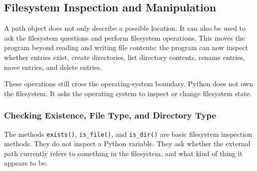 \subsection{Filesystem Inspection and Manipulation}

A path object does not only describe a possible location. It can also be used to ask the filesystem questions and perform filesystem operations. This moves the program beyond reading and writing file contents: the program can now inspect whether entries exist, create directories, list directory contents, rename entries, move entries, and delete entries.

These operations still cross the operating-system boundary. Python does not own the filesystem. It asks the operating system to inspect or change filesystem state.

\subsubsection{Checking Existence, File Type, and Directory Type}

The methods \texttt{exists()}, \texttt{is\_file()}, and \texttt{is\_dir()} are basic filesystem inspection methods. They do not inspect a Python variable. They ask whether the external path currently refers to something in the filesystem, and what kind of thing it appears to be.

